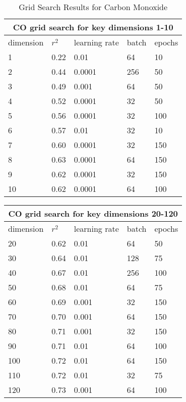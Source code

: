 \documentclass{article}
\begin{document}
\begin{table}[h!]
\begin{center}
    \caption{Grid Search Results for Carbon Monoxide}
    \label{tab:table2}
    \vspace{0.1cm}
    \begin{tabular}{p{2cm}p{2cm}p{2cm}p{2cm}p{2cm}}
        \hline
        \multicolumn{5}{c}{CO grid search for key dimensions 1-10}\\
        \hline
        dimension & $r^{2}$ & learning rate & batch & epochs  \\
        \hline
        1 & 0.22 & 0.01 & 64 & 10 \\
        2 & 0.44 & 0.0001 & 256 & 50\\
        3 & 0.49 & 0.001 & 64 & 50\\
        4 & 0.52 & 0.0001 & 32 & 50\\
        5 & 0.56 & 0.0001 & 32 & 100\\
        6 & 0.57 & 0.01 & 32 & 10\\
        7 & 0.60 & 0.0001 & 32 & 150\\
        8 & 0.63 & 0.0001 & 64 & 150\\
        9 & 0.62 & 0.0001 & 32 & 150\\
        10 & 0.62 & 0.0001 & 64 & 100\\
        \hline
    \end{tabular}
\end{center}
\end{table}
\begin{table}[h!]
\begin{center}
    \label{tab:table2}
    \vspace{0.1cm}
    \begin{tabular}{p{2cm}p{2cm}p{2cm}p{2cm}p{2cm}}
        \hline
        \multicolumn{5}{c}{CO grid search for key dimensions 20-120}\\
        \hline
        dimension & $r^{2}$ & learning rate & batch & epochs  \\
        \hline
        20 & 0.62 & 0.01 & 64 & 50\\
        30 & 0.64 & 0.01 & 128 & 75\\
        40 & 0.67 & 0.01 & 256 & 100\\
        50 & 0.68 & 0.01 & 64 & 75\\
        60 & 0.69 & 0.001 & 32 & 150\\
        70 & 0.70 & 0.001 & 64 & 150\\
        80 & 0.71 & 0.001 & 32 & 150\\
        90 & 0.71 & 0.01 & 64 & 100\\
        100 & 0.72 & 0.01 & 64 & 150\\
        110 & 0.72 & 0.01 & 32 & 75\\
        120 & 0.73 & 0.001 & 64 & 100\\
        \hline
    \end{tabular}
\end{center}
\end{table}
\newpage
\end{document}
